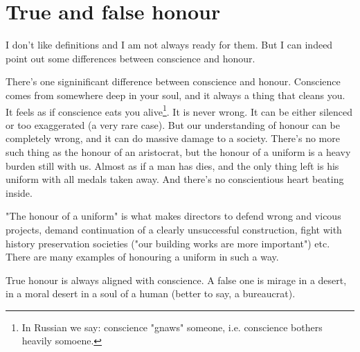 \chapter{True and false honour}

I don't like definitions and I am not always ready for them. But I can indeed point out some differences between conscience and honour.

There's one signinificant difference between conscience and honour. Conscience comes from somewhere deep in your soul, and it always a thing that cleans you. It feels as if conscience eats you alive\footnote{In Russian we say: conscience "gnaws" someone, i.e. conscience bothers heavily somoene.}. It is never wrong. It can be either silenced or too exaggerated (a very rare case). But our understanding of honour can be completely wrong, and it can do massive damage to a society. There's no more such thing as the honour of an aristocrat, but the honour of a uniform is a heavy burden still with us. Almost as if a man has dies, and the only thing left is his uniform with all medals taken away. And there's no conscientious heart beating inside.

"The honour of a uniform" is what makes directors to defend wrong and vicous projects, demand continuation of a clearly unsuccessful construction, fight with history preservation societies ("our building works are more important") etc. There are many examples of honouring a uniform in such a way.

True honour is always aligned with conscience. A false one is mirage in a desert, in a moral desert in a soul of a human (better to say, a bureaucrat).